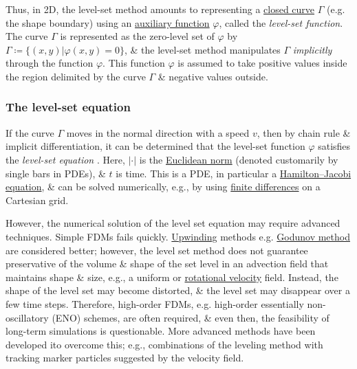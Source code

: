 \documentclass{article}
\begin{document}
Thus, in 2D, the level-set method amounts to representing a \href{https://en.wikipedia.org/wiki/Closed_curve}{closed curve} $\Gamma$ (e.g. the shape boundary) using an \href{https://en.wikipedia.org/wiki/Auxiliary_function}{auxiliary function} $\varphi$, called the {\it level-set function}. The curve $\Gamma$ is represented as the zero-level set of $\varphi$ by $\Gamma\coloneqq\{(x,y)|\varphi(x,y) = 0\}$, \& the level-set method manipulates $\Gamma$ {\it implicitly} through the function $\varphi$. This function $\varphi$ is assumed to take positive values inside the region delimited by the curve $\Gamma$ \& negative values outside.

\subsubsection{The level-set equation}
If the curve $\Gamma$ moves in the normal direction with a speed $v$, then by chain rule \& implicit differentiation, it can be determined that the level-set function $\varphi$ satisfies the {\it level-set equation} . Here, $|\cdot|$ is the \href{https://en.wikipedia.org/wiki/Euclidean_norm}{Euclidean norm} (denoted customarily by single bars in PDEs), \& $t$ is time. This is a PDE, in particular a \href{https://en.wikipedia.org/wiki/Hamilton%E2%80%93Jacobi_equation}{Hamilton--Jacobi equation}, \& can be solved numerically, e.g., by using \href{https://en.wikipedia.org/wiki/Finite_difference}{finite differences} on a Cartesian grid.

However, the numerical solution of the level set equation may require advanced techniques. Simple FDMs fails quickly. \href{https://en.wikipedia.org/wiki/Upwind_scheme}{Upwinding} methods e.g. \href{https://en.wikipedia.org/wiki/Godunov_method}{Godunov method} are considered better; however, the level set method does not guarantee preservative of the volume \& shape of the set level in an advection field that maintains shape \& size, e.g., a uniform or \href{https://en.wikipedia.org/wiki/Rotational_velocity}{rotational velocity} field. Instead, the shape of the level set may become distorted, \& the level set may disappear over a few time steps. Therefore, high-order FDMs, e.g. high-order essentially non-oscillatory (ENO) schemes, are often required, \& even then, the feasibility of long-term simulations is questionable. More advanced methods have been developed ito overcome this; e.g., combinations of the leveling method with tracking marker particles suggested by the velocity field.
\end{document}
